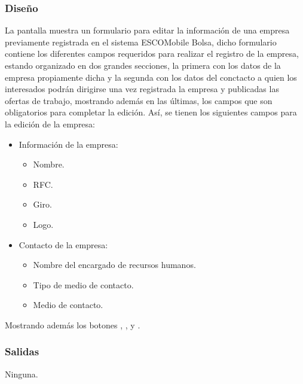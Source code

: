 \subsubsection{Diseño}
	\noindent
	La pantalla muestra un formulario para editar la información de una empresa previamente registrada en el sistema ESCOMobile Bolsa, dicho formulario contiene los diferentes campos requeridos para realizar el registro de la empresa, estando organizado en dos grandes secciones, la primera con los datos de la empresa propiamente dicha y la segunda con los datos del conctacto a quien los interesados podrán dirigirse una vez registrada la empresa y publicadas las ofertas de trabajo, mostrando además en las últimas, los campos que son obligatorios para completar la edición. Así, se tienen los siguientes campos para la edición de la empresa:
	\begin{itemize}
		\item Información de la empresa:
		\begin{itemize}
			\item Nombre.
			\item RFC.
			\item Giro.
			\item Logo.
		\end{itemize}
		\item Contacto de la empresa:
		\begin{itemize}
			\item Nombre del encargado de recursos humanos.
			\item Tipo de medio de contacto. 
			\item Medio de contacto. 
		\end{itemize}
	\end{itemize}
	Mostrando además los botones , \IUbutton{+},  y .


\subsubsection{Salidas}
	\noindent
	Ninguna.

